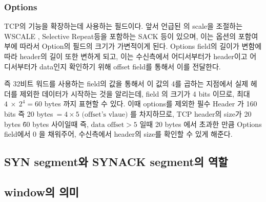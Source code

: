    \subsubsection*{Options}
        TCP의 기능을 확장하는데  사용하는 필드이다. 앞서 언급된 의 scale을 조절하는 WSCALE , Selective Repeat등을 포함하는 SACK 등이 있으며, 이는 옵션의 포함여부에 따라서 Option의 필드의 크기가 가변적이게 된다. 
        Options field의 길이가 변함에따라 header의 길이 또한 변하게 되고, 이는 수신측에서 어디서부터가 header이고 어디서부터가 data인지 확인하기 위해 offset field를 통해서 이를 전달한다. 
        
        즉 32비트 워드를 사용하는  field의 값을 통해서 이 값의 4를 곱하는 지점에서 실제 헤더를 제외한 데이터가 시작하는 것을 알리는데,  field 의 크기가 4 bits 이므로,  최대 $4\ \times\ 2^4 = 60$ bytes 까지 표현할 수 있다. 
        이때 options를 제외한 필수 Header 가 160 bits 즉 20 bytes$\ = 4 \times 5 \text{ (offset's vlaue)}$ 를 차지하므로, TCP header의 size가 20 bytes \~ 60 bytes 사이일때 즉, $\text{data offset} > 5$ 일때 20 bytes 에서 초과한 만큼 Options field에서 0 을 채워주어, 수신측에서 header의 size를 확인할 수 있게 해준다.
\newpage
\subsection{SYN segment와 SYNACK segment의 역할}
    
\subsection{window의 의미}

\clearpage